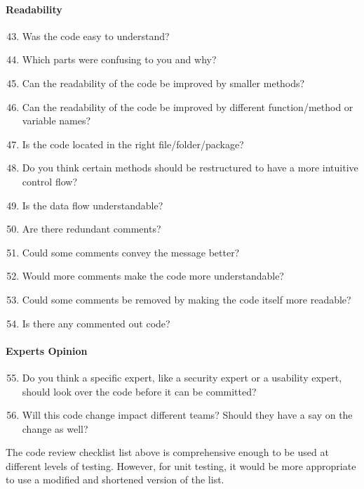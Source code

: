 \paragraph{Readability}
\begin{enumerate}[nosep]
 \setcounter{enumi}{42}
   \item Was the code easy to understand?
   \item Which parts were confusing to you and why?
   \item Can the readability of the code be improved by smaller methods?
   \item Can the readability of the code be improved by different function/method or variable names?
   \item Is the code located in the right file/folder/package?
   \item Do you think certain methods should be restructured to have a more intuitive control flow?
   \item Is the data flow understandable?
   \item Are there redundant comments?
   \item Could some comments convey the message better?
   \item Would more comments make the code more understandable?
   \item Could some comments be removed by making the code itself more readable?
    \item Is there any commented out code?
\end{enumerate}

\paragraph{Experts Opinion}
\begin{enumerate}[nosep]
 \setcounter{enumi}{54}
   \item Do you think a specific expert, like a security expert or a usability expert, should look over the code before it can be committed?
   \item Will this code change impact different teams? Should they have a say on the change as well? 
\end{enumerate}
The code review checklist list above is comprehensive enough to be used at different levels of testing. However, for unit testing, it would be more appropriate to use a modified and shortened version of the list.


